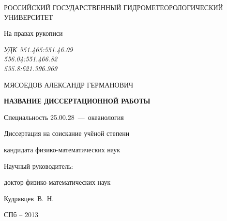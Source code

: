 \thispagestyle{empty}

\begin{center}
РОССИЙСКИЙ ГОСУДАРСТВЕННЫЙ ГИДРОМЕТЕОРОЛОГИЧЕСКИЙ УНИВЕРСИТЕТ\par
\par 
\par
\end{center}

\vspace{20mm}
\begin{flushright}
На правах рукописи

{\sl УДК 551.465:551.46.09\\556.04:551.466.82\\535.8:621.396.969}

\end{flushright}

\vspace{30mm}
\begin{center}
{\large МЯСОЕДОВ АЛЕКСАНДР ГЕРМАНОВИЧ}
\end{center}

\vspace{5mm}
\begin{center}
{\bf \large НАЗВАНИЕ ДИССЕРТАЦИОННОЙ РАБОТЫ
\par}

\vspace{10mm}
{%
Специальность 25.00.28~---~океанология
}

\vspace{10mm}
Диссертация на соискание учёной степени

кандидата физико-математических наук
\end{center}

\vspace{20mm}
\begin{flushright}
Научный руководитель:

доктор физико-математических наук

Кудрявцев~В.~Н.

\end{flushright}

\vspace{20mm}
\begin{center}
{СПб -- 2013}
\end{center}

\newpage